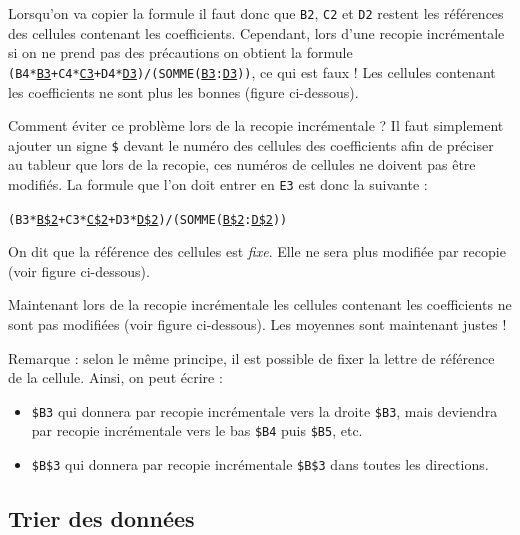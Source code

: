 Lorsqu'on va copier la formule il faut donc que \texttt{B2}, \texttt{C2} et \texttt{D2} restent les références des cellules contenant les coefficients. Cependant, lors d'une recopie incrémentale si on ne prend pas des précautions on obtient la formule \texttt{(B4*\underline{B3}+C4*\underline{C3}+D4*\underline{D3})/(SOMME(\underline{B3}:\underline{D3}))}, ce qui est faux ! Les cellules contenant les coefficients ne sont plus les bonnes (figure ci-dessous).


Comment éviter ce problème lors de la recopie incrémentale ? Il faut simplement ajouter un signe \texttt{\$} devant le numéro des cellules des coefficients afin de préciser au tableur que lors de la recopie, ces numéros de cellules ne doivent pas être modifiés. La formule que l'on doit entrer en \texttt{E3} est donc la suivante :

\begin{center}\texttt{(B3*\underline{B\$2}+C3*\underline{C\$2}+D3*\underline{D\$2})/(SOMME(\underline{B\$2}:\underline{D\$2}))}\end{center}

On dit que la référence des cellules est \emph{fixe}. Elle ne sera plus modifiée par recopie (voir figure ci-dessous).


Maintenant lors de la recopie incrémentale les cellules contenant les coefficients ne sont pas modifiées (voir figure ci-dessous). Les moyennes sont maintenant justes !


Remarque : selon le même principe, il est possible de fixer la lettre de référence de la cellule. Ainsi, on peut écrire :

\begin{itemize}
\item \texttt{\$B3} qui donnera par recopie incrémentale vers la droite \texttt{\$B3}, mais deviendra par recopie incrémentale vers le bas \texttt{\$B4} puis \texttt{\$B5}, etc.
\item \texttt{\$B\$3} qui donnera par recopie incrémentale \texttt{\$B\$3} dans toutes les directions.
\end{itemize}

\subsection{Trier des données}\label{Calc3tri} 

